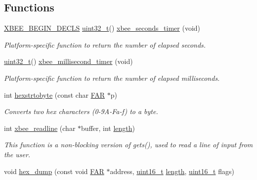 \subsection*{Functions}
\begin{DoxyCompactItemize}
\item 
\hyperlink{group__hal_ga336bff4f4a6012aacc4468132bbd3d7f}{X\+B\+E\+E\+\_\+\+B\+E\+G\+I\+N\+\_\+\+D\+E\+C\+LS} \hyperlink{group__hal__dos_ga09a1e304d66d35dd47daffee9731edaa}{uint32\+\_\+t}() \hyperlink{group__hal_ga5c1a8bccd41acf1d7264a75698077749}{xbee\+\_\+seconds\+\_\+timer} (void)
\begin{DoxyCompactList}\small\item\em Platform-\/specific function to return the number of elapsed seconds. \end{DoxyCompactList}\item 
\hyperlink{group__hal__dos_ga09a1e304d66d35dd47daffee9731edaa}{uint32\+\_\+t}() \hyperlink{group__hal_ga22b4e3df788254ca5f8530e9aee58515}{xbee\+\_\+millisecond\+\_\+timer} (void)
\begin{DoxyCompactList}\small\item\em Platform-\/specific function to return the number of elapsed milliseconds. \end{DoxyCompactList}\item 
int \hyperlink{group__hal_ga519e5ae2049b59689a474a8c48fee353}{hexstrtobyte} (const char \hyperlink{group__hal_gaef060b3456fdcc093a7210a762d5f2ed}{F\+AR} $\ast$p)
\begin{DoxyCompactList}\small\item\em Converts two hex characters (0-\/9\+A-\/\+Fa-\/f) to a byte. \end{DoxyCompactList}\item 
int \hyperlink{group__hal_ga8c0c80b64f63d395e718172190b21fcc}{xbee\+\_\+readline} (char $\ast$buffer, int \hyperlink{group__zdo_gab2b3adeb2a67e656ff030b56727fd0ac}{length})
\begin{DoxyCompactList}\small\item\em This function is a non-\/blocking version of gets(), used to read a line of input from the user. \end{DoxyCompactList}\item 
void \hyperlink{group__hal_gaa321236a0cb6f4e0dad592fdf1b550d2}{hex\+\_\+dump} (const void \hyperlink{group__hal_gaef060b3456fdcc093a7210a762d5f2ed}{F\+AR} $\ast$address, \hyperlink{group__hal__dos_ga5a8b2dc9e45a9ee81a94ef304fb62505}{uint16\+\_\+t} \hyperlink{group__zdo_gab2b3adeb2a67e656ff030b56727fd0ac}{length}, \hyperlink{group__hal__dos_ga5a8b2dc9e45a9ee81a94ef304fb62505}{uint16\+\_\+t} flags)

\end{DoxyCompactItemize}
